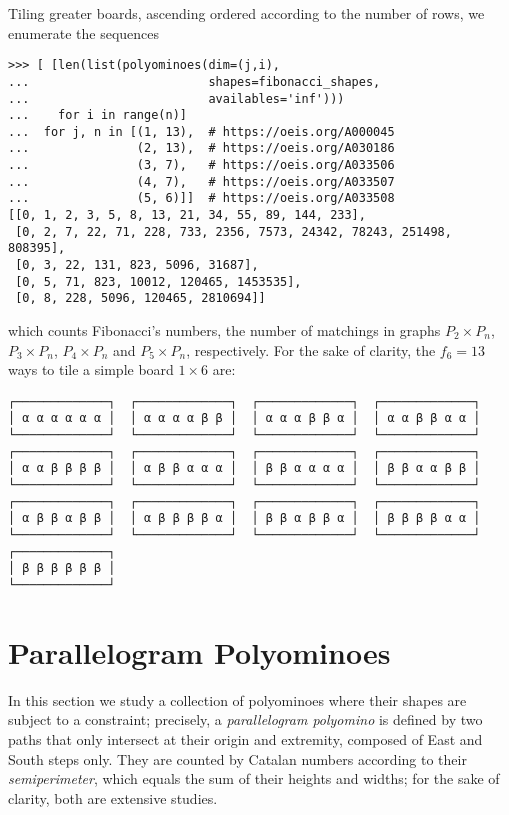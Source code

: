 Tiling greater boards, ascending ordered according to the
number of rows, we enumerate the sequences
\begin{verbatim}
>>> [ [len(list(polyominoes(dim=(j,i),
...                         shapes=fibonacci_shapes,
...                         availables='inf')))
...    for i in range(n)]
...  for j, n in [(1, 13),  # https://oeis.org/A000045
...               (2, 13),  # https://oeis.org/A030186
...               (3, 7),   # https://oeis.org/A033506
...               (4, 7),   # https://oeis.org/A033507
...               (5, 6)]]  # https://oeis.org/A033508
[[0, 1, 2, 3, 5, 8, 13, 21, 34, 55, 89, 144, 233],
 [0, 2, 7, 22, 71, 228, 733, 2356, 7573, 24342, 78243, 251498, 808395],
 [0, 3, 22, 131, 823, 5096, 31687],
 [0, 5, 71, 823, 10012, 120465, 1453535],
 [0, 8, 228, 5096, 120465, 2810694]]
\end{verbatim}
which counts Fibonacci's numbers, the number of matchings in graphs $P_2 \times
P_n$, $P_{3} \times P_{n}$, $P_{4} \times P_{n}$ and $P_{5} \times P_{n}$,
respectively. For the sake of clarity, the $f_{6} = 13$ ways to tile a
simple board $1\times 6$ are:
\begin{Verbatim}[baselinestretch=0.1, fontsize=\small]
┌─────────────┐  ┌─────────────┐  ┌─────────────┐  ┌─────────────┐
│ α α α α α α │  │ α α α α β β │  │ α α α β β α │  │ α α β β α α │
└─────────────┘  └─────────────┘  └─────────────┘  └─────────────┘
┌─────────────┐  ┌─────────────┐  ┌─────────────┐  ┌─────────────┐
│ α α β β β β │  │ α β β α α α │  │ β β α α α α │  │ β β α α β β │
└─────────────┘  └─────────────┘  └─────────────┘  └─────────────┘
┌─────────────┐  ┌─────────────┐  ┌─────────────┐  ┌─────────────┐
│ α β β α β β │  │ α β β β β α │  │ β β α β β α │  │ β β β β α α │
└─────────────┘  └─────────────┘  └─────────────┘  └─────────────┘
┌─────────────┐
│ β β β β β β │
└─────────────┘
\end{Verbatim}

\section{Parallelogram Polyominoes}

In this section we study a collection of polyominoes where their shapes are
subject to a constraint; precisely, a \textit{parallelogram polyomino} is
defined by two paths that only intersect at their origin and extremity,
composed of East and South steps only. They are counted by Catalan numbers
according to their \textit{semiperimeter}, which equals the sum of their
heights and widths; for the sake of clarity, both
\citep{delest1993enumeration,delest:enumeration:pp} are extensive studies.

